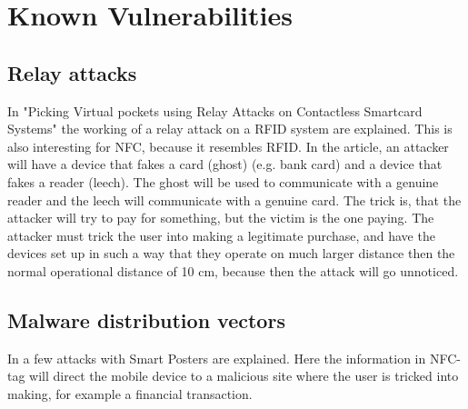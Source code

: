 \chapter{Known Vulnerabilities}
\label{chap:known_vulnerabilities}

\section{Relay attacks}
In "Picking Virtual pockets using Relay Attacks on Contactless Smartcard Systems" the working of a relay attack on  a RFID system are explained.
This is also interesting for NFC, because it resembles RFID.
In the article, an attacker will have a device that fakes a card (ghost) (e.g. bank card) and a device that fakes a reader (leech). 
The ghost will be used to communicate with a genuine reader and the leech will communicate with a genuine card.
The trick is, that the attacker will try to pay for something, but the victim is the one paying.
The attacker must trick the user into making a legitimate purchase, and have the devices set up in such a way that they operate on much larger distance then the normal operational distance of 10 cm, because then the attack will go unnoticed.



\section{Malware distribution vectors}
In \cite{10.1109/ARES.2009.46} a few attacks with Smart Posters are explained.
Here the information in NFC-tag will direct the mobile device to a malicious site where the user is tricked into making, for example a financial transaction.


